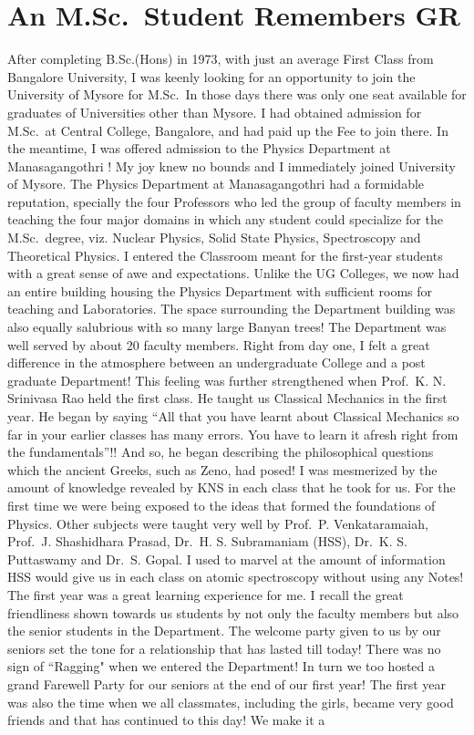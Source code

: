 \chapter{An M.Sc.\ Student Remembers GR}\label{chap18}




After completing B.Sc.(Hons) in 1973, with just an average First Class from Bangalore University, I was keenly looking for an opportunity to join the University of Mysore for M.Sc.\ In those days there was only one seat available for graduates of Universities other than Mysore. I had obtained admission for M.Sc.\ at Central College, Bangalore, and had paid up the Fee to join there. In the meantime, I was offered admission to the Physics Department at Manasagangothri ! My joy knew no bounds and I immediately joined University of Mysore. The Physics Department at Manasagangothri had a formidable reputation, specially the four Professors who led the group of faculty members in teaching the four major domains in which any student could specialize for the M.Sc.\  degree, viz. Nuclear Physics, Solid State Physics, Spectroscopy and Theoretical Physics. I entered the Classroom meant for the first-year students with a great sense of awe and expectations. Unlike the UG Colleges, we now had an entire building housing the Physics Department with sufficient rooms for teaching and Laboratories. The space surrounding the Department building was also equally salubrious with so many large Banyan trees! The Department was well served by about 20 faculty members. Right from day one, I felt a great difference in the atmosphere between an undergraduate College and a post graduate Department! This feeling was further strengthened when Prof.\ K. N. Srinivasa Rao held the first class. He taught us Classical Mechanics in the first year. He began by saying  ``All that you have learnt about Classical Mechanics so far in your earlier classes has many errors. You have to learn it afresh right from the fundamentals”!! And so, he began describing the philosophical questions which the ancient Greeks, such as Zeno, had posed! I was mesmerized by the amount of knowledge revealed by KNS in each class that he took for us. For the first time we were being exposed to the ideas that formed the foundations of Physics. Other subjects were taught very well by Prof.\ P. Venkataramaiah, Prof.\ J. Shashidhara Prasad, Dr.\ H. S. Subramaniam (HSS), Dr.\ K. S. Puttaswamy and Dr.\ S. Gopal. I used to marvel at the amount of information HSS would give us in each class on atomic spectroscopy without using any Notes! The first year was a great learning experience for me. I recall the great friendliness shown towards us students by not only the faculty members but also the senior students in the Department. The welcome party given to us by our seniors set the tone for a relationship that has lasted till today! There was no sign of ``Ragging" when we entered the Department! In turn we too hosted a grand Farewell Party for our seniors at the end of our first year! The first year was also the time when we all classmates, including the girls, became very good friends and that has continued to this day! We make it a 